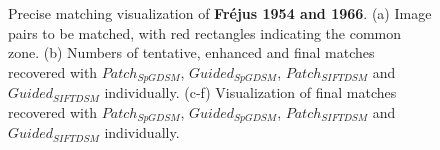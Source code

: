 \begin{figure}[htbp]
\begin{center}
{		}
		\caption{Precise matching visualization of \textbf{Fr{\'e}jus 1954 and 1966}. (a) Image pairs to be matched, with red rectangles indicating the common zone. (b) Numbers of tentative, enhanced and final matches recovered with $Patch_{SpGDSM}$, $Guided_{SpGDSM}$, $Patch_{SIFTDSM}$ and $Guided_{SIFTDSM}$ individually. (c-f) Visualization of final matches recovered with $Patch_{SpGDSM}$, $Guided_{SpGDSM}$, $Patch_{SIFTDSM}$ and $Guided_{SIFTDSM}$ individually.}
		\label{MatchVizFrejus1954-1966}
	\end{center}
\end{figure} 

